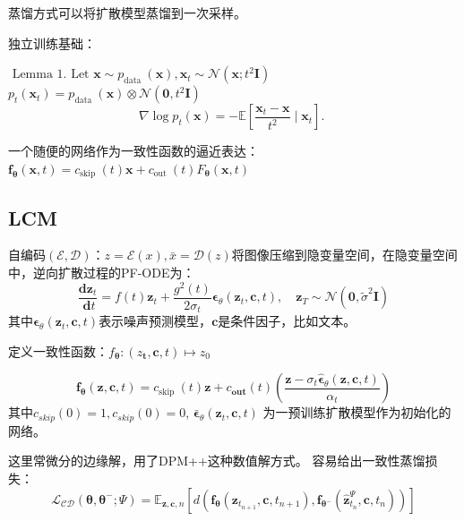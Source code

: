 \documentclass[lang=cn,newtx,10pt,scheme=chinese]{elegantbook}
\begin{document}
蒸馏方式可以将扩散模型蒸馏到一次采样。

独立训练基础：

$\text { Lemma 1. Let } \mathbf{x} \sim p_{\text {data }}(\mathbf{x}), \mathbf{x}_t \sim \mathcal{N}\left(\mathbf{x} ; t^2 \boldsymbol{I}\right)$   $p_t\left(\mathbf{x}_t\right)=p_{\text {data }}(\mathbf{x}) \otimes \mathcal{N}\left(\mathbf{0}, t^2 \boldsymbol{I}\right) $  
\begin{equation} 
  \nabla \log p_t(\mathbf{x})=-\mathbb{E}\left[\frac{\mathbf{x}_t-\mathbf{x}}{t^2} \mid \mathbf{x}_t\right] \text {. }
\end{equation}

一个随便的网络作为一致性函数的逼近表达：
$\boldsymbol{f}_{\boldsymbol{\theta}}(\mathbf{x}, t)=c_{\text {skip }}(t) \mathbf{x}+c_{\text {out }}(t) F_{\boldsymbol{\theta}}(\mathbf{x}, t)$

\subsection{LCM}
自编码$(\mathcal{E}, \mathcal{D})$：$z=\mathcal{E}(x), \bar{x}=\mathcal{D}(z)$将图像压缩到隐变量空间，在隐变量空间中，逆向扩散过程的PF-ODE为：
\begin{equation}
\frac{\mathbf{d} \boldsymbol{z}_t}{\mathbf{~d} t}=f(t) \boldsymbol{z}_t+\frac{g^2(t)}{2 \sigma_t} \boldsymbol{\epsilon}_\theta\left(\boldsymbol{z}_t, \boldsymbol{c}, t\right), \quad \boldsymbol{z}_T \sim \mathcal{N}\left(\mathbf{0}, \tilde{\sigma}^2 \boldsymbol{I}\right)
\end{equation}
其中$\boldsymbol{\epsilon}_\theta\left(\boldsymbol{z}_t, \boldsymbol{c}, t\right)$表示噪声预测模型，$\boldsymbol{c}$是条件因子，比如文本。

定义一致性函数：$f_{\boldsymbol{\theta}}:\left(z_{\boldsymbol{t}}, \boldsymbol{c}, t\right) \mapsto z_0$

\begin{equation}
\boldsymbol{f}_{\boldsymbol{\theta}}(\boldsymbol{z}, \boldsymbol{c}, t)=c_{\text {skip }}(t) \boldsymbol{z}+c_{\mathbf{out}}(t)\left(\frac{\boldsymbol{z}-\sigma_t \hat{\boldsymbol{\epsilon}}_\theta(\boldsymbol{z}, \boldsymbol{c}, t)}{\alpha_t}\right)
\end{equation}
其中$c_{skip}(0)=1, c_{skip}(0)=0$, $\boldsymbol{\bar{\epsilon}}_\theta\left(\boldsymbol{z}_t, \boldsymbol{c}, t\right)$ 为一预训练扩散模型作为初始化的网络。

这里常微分的边缘解，用了DPM++这种数值解方式。
容易给出一致性蒸馏损失：
\begin{equation}
\mathcal{L}_{\mathcal{C D}}\left(\boldsymbol{\theta}, \boldsymbol{\theta}^{-} ; \Psi\right)=\mathbb{E}_{\boldsymbol{z}, \boldsymbol{c}, n}\left[d\left(\boldsymbol{f}_{\boldsymbol{\theta}}\left(\boldsymbol{z}_{t_{n+1}}, \boldsymbol{c}, t_{n+1}\right), \boldsymbol{f}_{\boldsymbol{\theta}^{-}}\left(\hat{\boldsymbol{z}}_{t_n}^{\Psi}, \boldsymbol{c}, t_n\right)\right)\right]
\end{equation}
\end{document}
